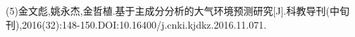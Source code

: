 \documentclass[preview]{standalone}
\begin{document}
\begin{center}
(5)金文彪,姚永杰,金哲植.基于主成分分析的大气环境预测研究[J].科教导刊(中旬刊),2016(32):148-150.DOI:10.16400/j.cnki.kjdkz.2016.11.071.
\end{center}
\end{document}
